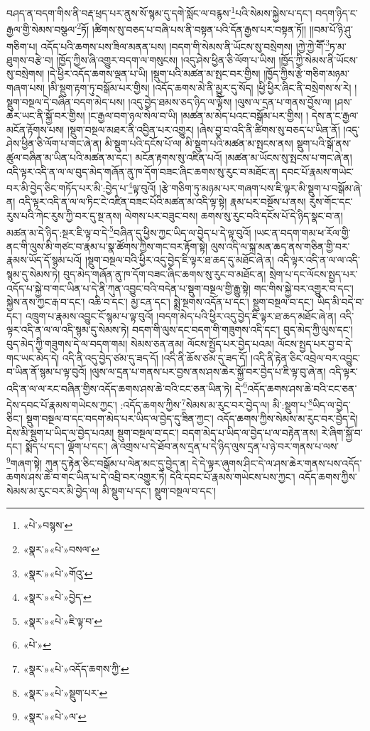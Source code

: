 བཤད་ན་བདག་གིས་ནི་བརྡ་ཕྲད་པར་ནུས་སོ་སྙམ་དུ་དགེ་སློང་ལ་བརྙས་\footnote{«པེ་»བསྙས་}པའི་སེམས་སྐྱེས་པ་དང་། བདག་ཉིད་ང་རྒྱལ་གྱི་སེམས་བསྩལ་\footnote{«སྣར་»«པེ་»བསལ་}ཏོ། །ཚིགས་སུ་བཅད་པ་བཞི་པས་ནི་བསྟན་པའི་དོན་རྒྱས་པར་བསྟན་ཏོ།། །།བམ་པོ་ཉི་ཤུ་གཅིག་པ། འདོད་པའི་ཆགས་པས་ཟིལ་མནན་པས། །བདག་གི་སེམས་ནི་ཡོངས་སུ་བསྲེགས། །ཀྱེ་ཀྱེ་གཽ་\footnote{«སྣར་»«པེ་»གོའུ་}ཏ་མ་ཐུགས་བརྩེ་བ། །ཁྱོད་ཀྱིས་ཞི་འགྱུར་བདག་ལ་གསུངས། །འདུ་ཤེས་ཕྱིན་ཅི་ལོག་པ་ཡིས། །ཁྱོད་ཀྱི་སེམས་ནི་ཡོངས་སུ་བསྲེགས། །དེ་ཕྱིར་འདོད་ཆགས་ལྡན་པ་ཡི། །སྡུག་པའི་མཚན་མ་སྤང་བར་གྱིས། །ཁྱོད་ཀྱིས་རྩེ་གཅིག་མཉམ་གཞག་པས། །མི་སྡུག་རྟག་ཏུ་བསྒོམ་པར་གྱིས། །འདོད་ཆགས་མེ་ནི་མྱུར་དུ་སོད། །ཕྱི་ཕྱིར་ཞིང་ནི་བསྲེགས་ས་རེ། །སྡུག་བསྔལ་དེ་བཞིན་བདག་མེད་པས། །འདུ་བྱེད་ཐམས་ཅད་ཉིད་ལ་ལྟོས། །ལུས་ལ་དྲན་པ་གནས་བྱོས་ལ། །ཤས་ཆེར་ཡང་ནི་སྐྱོ་བར་གྱིས། །ང་རྒྱལ་བག་ཉལ་སེལ་བ་ཡི། །མཚན་མ་མེད་པའང་བསྒོམ་པར་གྱིས། །
དེས་ན་ང་རྒྱལ་མངོན་རྟོགས་པས། །སྡུག་བསྔལ་མཐར་ནི་འབྱིན་པར་འགྱུར། །ཞེས་བྱ་བ་འདི་ནི་ཚིགས་སུ་བཅད་པ་ཡིན་ནོ། །འདུ་ཤེས་ཕྱིན་ཅི་ལོག་པ་གང་ཞེ་ན། མི་སྡུག་པའི་དངོས་པོ་ལ། མི་སྡུག་པའི་མཚན་མ་སྤངས་ནས། སྡུག་པའི་སྒོ་ནས་ཚུལ་བཞིན་མ་ཡིན་པའི་མཚན་མ་དང་། མངོན་རྟགས་སུ་འཛིན་པའོ། །མཚན་མ་ཡོངས་སུ་སྤངས་པ་གང་ཞེ་ན། འདི་ལྟར་འདི་ན་ལ་ལ་བུད་མེད་གཞོན་ནུ་ཁ་དོག་བཟང་ཞིང་ཆགས་སུ་རུང་བ་མཐོང་ན། དབང་པོ་རྣམས་གཡེང་བར་མི་བྱེད་ཅིང་གཏོད་པར་མི་:བྱེད་པ་\footnote{«སྣར་»«པེ་»བྱེད་}ལྟ་བུའོ། །རྩེ་གཅིག་ཏུ་མཉམ་པར་གཞག་པས་ཇི་ལྟར་མི་སྡུག་པ་བསྒོམ་ཞེ་ན། འདི་ལྟར་འདི་ན་ལ་ལ་ཏིང་ངེ་འཛིན་བཟང་པོའི་མཚན་མ་འདི་ལྟ་སྟེ། རྣམ་པར་བསྔོས་པ་ནས། རུས་གོང་དང་རུས་པའི་ཀེང་རུས་ཀྱི་བར་དུ་སྔ་ནས། ལེགས་པར་བཟུང་བས། ཆགས་སུ་རུང་བའི་དངོས་པོ་དེ་ཉིད་སྣང་བ་ན། མཚན་མ་དེ་ཉིད་:སྔར་ཇི་ལྟ་བ་དེ་\footnote{«སྣར་»«པེ་»ཇི་ལྟ་བ་}བཞིན་དུ་ཕྱིས་ཀྱང་ཡིད་ལ་བྱེད་པ་དེ་ལྟ་བུའོ། །ཡང་ན་བདག་གམ་ཕ་རོལ་གྱི་ནང་གི་ལུས་མི་གཙང་བ་རྣམ་པ་སྣ་ཚོགས་ཀྱིས་གང་བར་རྟོག་སྟེ། ལུས་འདི་ལ་སྐྲ་མན་ཆད་ནས་གཅིན་གྱི་བར་རྣམས་ཡོད་དོ་སྙམ་པའོ། །སྡུག་བསྔལ་བའི་ཕྱིར་འདུ་བྱེད་ཇི་ལྟར་ཐ་ཆད་དུ་མཐོང་ཞེ་ན། འདི་ལྟར་འདི་ན་ལ་ལ་འདི་སྙམ་དུ་སེམས་ཏེ། བུད་མེད་གཞོན་ནུ་ཁ་དོག་བཟང་ཞིང་ཆགས་སུ་རུང་བ་མཐོང་ན། སྲེག་པ་དང་ལོངས་སྤྱད་པར་འདོད་པ་སྐྱེ་བ་གང་ཡིན་པ་དེ་ནི་ཀུན་འབྱུང་བའི་བདེན་པ་སྡུག་བསྔལ་གྱི་རྒྱུ་སྟེ། གང་གིས་སྐྱེ་བར་འགྱུར་བ་དང་། སྐྱེས་ནས་ཀྱང་རྒ་བ་དང་། འཆི་བ་དང་། མྱ་ངན་དང་། སྨྲེ་སྔགས་འདོན་པ་དང་། སྡུག་བསྔལ་བ་དང་། ཡིད་མི་བདེ་བ་དང་། འཁྲུག་པ་རྣམས་འབྱུང་ངོ་སྙམ་པ་ལྟ་བུའོ། །བདག་མེད་པའི་ཕྱིར་འདུ་བྱེད་ཇི་ལྟར་ཐ་ཆད་མཐོང་ཞེ་ན། འདི་ལྟར་འདི་ན་ལ་ལ་འདི་སྙམ་དུ་སེམས་ཏེ། བདག་གི་ལུས་དང་བདག་གི་གཟུགས་འདི་དང་། བུད་མེད་ཀྱི་ལུས་དང་། བུད་མེད་ཀྱི་གཟུགས་དེ་ལ་བདག་གམ། སེམས་ཅན་ནམ། ལོངས་སྤྱོད་པར་བྱེད་པའམ། ལོངས་སྤྱད་པར་བྱ་བ་དེ་གང་ཡང་མེད་དེ། འདི་ནི་འདུ་བྱེད་ཙམ་དུ་ཟད་དོ། །འདི་ནི་ཆོས་ཙམ་དུ་ཟད་དོ། །འདི་ནི་རྟེན་ཅིང་འབྲེལ་བར་འབྱུང་བ་ཡིན་ནོ་སྙམ་པ་ལྟ་བུའོ། །ལུས་ལ་དྲན་པ་གནས་པར་བྱས་ནས་ཤས་ཆེར་སྐྱོ་བར་བྱེད་པ་ཇི་ལྟ་བུ་ཞེ་ན། འདི་ལྟར་འདི་ན་ལ་ལ་རང་བཞིན་གྱིས་འདོད་ཆགས་ཤས་ཆེ་བའི་ངང་ཅན་ཡིན་ཏེ། དེ་\footnote{«པེ་»}འདོད་ཆགས་ཤས་ཆེ་བའི་ངང་ཅན་དེས་དབང་པོ་རྣམས་གཡེངས་ཀྱང་། :འདོད་ཆགས་ཀྱིས་\footnote{«སྣར་»«པེ་»འདོད་ཆགས་ཀྱི་}སེམས་མ་རུང་བར་བྱེད་ལ། མི་:སྡུག་པ་\footnote{«སྣར་»«པེ་»སྡུག་པར་}ཡིད་ལ་བྱེད་ཅིང་། སྡུག་བསྔལ་བ་དང་བདག་མེད་པར་ཡིད་ལ་བྱེད་དུ་ཟིན་ཀྱང་། འདོད་ཆགས་ཀྱིས་སེམས་མ་རུང་བར་བྱེད་དེ། དེས་མི་སྡུག་པ་ཡིད་ལ་བྱེད་པའམ། སྡུག་བསྔལ་བ་དང་། བདག་མེད་པ་ཡིད་ལ་བྱེད་པ་ལ་བརྟེན་ནས། རེ་ཞིག་སྐྱོ་བ་དང་། སྨོད་པ་དང་། ལྡོག་པ་དང་། ཞེ་འགྲས་པ་དེ་ཐོབ་ནས་དྲན་པ་དེ་ཉིད་ལུས་དྲན་པ་ཉེ་བར་གནས་པ་ལས་\footnote{«སྣར་»«པེ་»ལ་}གཞག་སྟེ། ཀུན་དུ་རྟེན་ཅིང་བསྒོམ་པ་ལེན་མང་དུ་བྱེད་ན། དེ་དེ་ལྟར་ཞུགས་ཤིང་དེ་ལ་ཤས་ཆེར་གནས་པས་འདོད་ཆགས་ཤས་ཆེ་བ་གང་ཡིན་པ་དེ་འབྲི་བར་འགྱུར་ཏེ། དེའི་དབང་པོ་རྣམས་གཡེངས་པས་ཀྱང་། འདོད་ཆགས་ཀྱིས་སེམས་མ་རུང་བར་མི་བྱེད་ལ། མི་སྡུག་པ་དང་། སྡུག་བསྔལ་བ་དང་། 